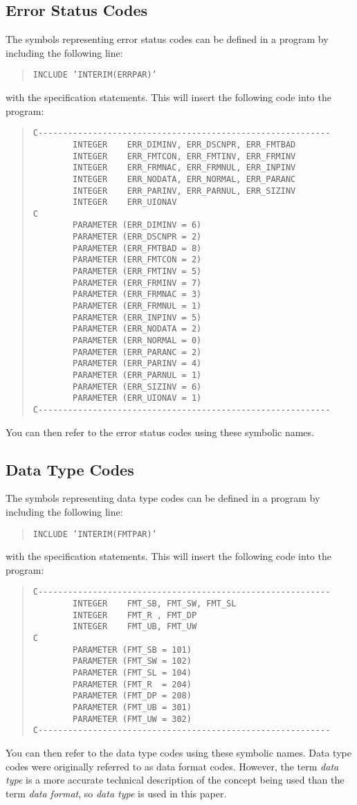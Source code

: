 \subsection {Error Status Codes}
The symbols representing error status codes can be defined in a program by
including the following line:
\begin{quote}
{\tt INCLUDE 'INTERIM(ERRPAR)'}
\end{quote}
with the specification statements.
This will insert the following code into the program:
\begin{quote}
\begin{verbatim}
C-----------------------------------------------------------
        INTEGER    ERR_DIMINV, ERR_DSCNPR, ERR_FMTBAD
        INTEGER    ERR_FMTCON, ERR_FMTINV, ERR_FRMINV
        INTEGER    ERR_FRMNAC, ERR_FRMNUL, ERR_INPINV
        INTEGER    ERR_NODATA, ERR_NORMAL, ERR_PARANC
        INTEGER    ERR_PARINV, ERR_PARNUL, ERR_SIZINV
        INTEGER    ERR_UIONAV
C
        PARAMETER (ERR_DIMINV = 6)
        PARAMETER (ERR_DSCNPR = 2)
        PARAMETER (ERR_FMTBAD = 8)
        PARAMETER (ERR_FMTCON = 2)
        PARAMETER (ERR_FMTINV = 5)
        PARAMETER (ERR_FRMINV = 7)
        PARAMETER (ERR_FRMNAC = 3)
        PARAMETER (ERR_FRMNUL = 1)
        PARAMETER (ERR_INPINV = 5)
        PARAMETER (ERR_NODATA = 2)
        PARAMETER (ERR_NORMAL = 0)
        PARAMETER (ERR_PARANC = 2)
        PARAMETER (ERR_PARINV = 4)
        PARAMETER (ERR_PARNUL = 1)
        PARAMETER (ERR_SIZINV = 6)
        PARAMETER (ERR_UIONAV = 1)
C-----------------------------------------------------------
\end{verbatim}
\end{quote}
You can then refer to the error status codes using these symbolic names.
\subsection {Data Type Codes}
The symbols representing data type codes can be defined in a program by
including the following line:
\begin{quote}
{\tt INCLUDE 'INTERIM(FMTPAR)'}
\end{quote}
with the specification statements.
This will insert the following code into the program:
\begin{quote}
\begin{verbatim}
C-----------------------------------------------------------
        INTEGER    FMT_SB, FMT_SW, FMT_SL
        INTEGER    FMT_R , FMT_DP
        INTEGER    FMT_UB, FMT_UW
C
        PARAMETER (FMT_SB = 101)
        PARAMETER (FMT_SW = 102)
        PARAMETER (FMT_SL = 104)
        PARAMETER (FMT_R  = 204)
        PARAMETER (FMT_DP = 208)
        PARAMETER (FMT_UB = 301)
        PARAMETER (FMT_UW = 302)
C-----------------------------------------------------------
\end{verbatim}
\end{quote}
You can then refer to the data type codes using these symbolic names.
Data type codes were originally referred to as data format codes.
However, the term {\em data type} is a more accurate technical description of the
concept being used than the term {\em data format}, so {\em data type} is used in this
paper.

